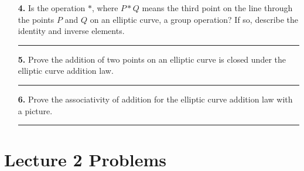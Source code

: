 \documentclass[12pt]{amsart}
\theoremstyle{definition}
\theoremstyle{remark}
\numberwithin{equation}{section}
\begin{document}
\begin{itemize}
    \item[\textbf{4.}] Is the operation $*$, where $P*Q$ means the third point on the line through the points $P$ and $Q$ on an elliptic curve, a group operation? If so, describe the identity and inverse elements.

    \vspace{5mm}

    \hrule{}

    \vspace{8mm}

    \item[\textbf{5.}] Prove the addition of two points on an elliptic curve is closed under the elliptic curve addition law.

    \vspace{2mm}

    \hrule{}

    \vspace{8mm}

    \item[\textbf{6.}] Prove the associativity of addition for the elliptic curve addition law with a picture.

    \vspace{2mm}

    \hrule{}



    
    
\end{itemize}

\section*{Lecture 2 Problems}
\end{document}
